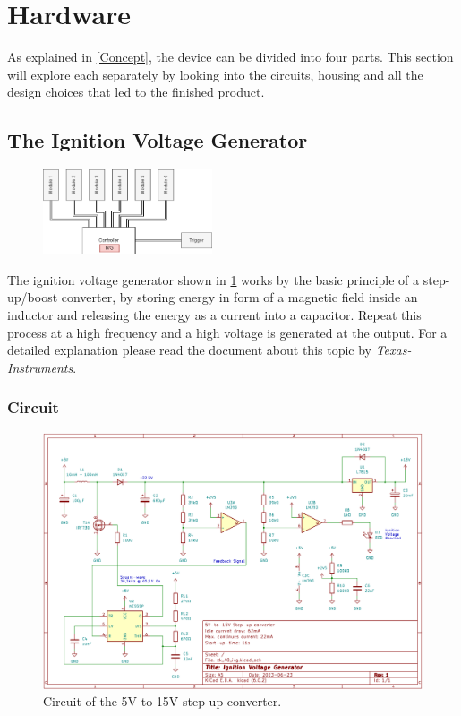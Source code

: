 \section{Hardware}
\label{Hardware}

As explained in \cref{Concept}, the device can be divided into four parts. This section will explore each separately by looking into the circuits, housing and all the design choices that led to the finished product. \\


\subsection{The Ignition Voltage Generator}
\label{Ignition Voltage Generator}

\begin{figure}[!ht]
    \centering
    \includegraphics[width=5cm]{./Figures/concept_ivg.png} 
\end{figure}

\noindent The ignition voltage generator shown in \cref{fig:ivg_circuit} works by the basic principle of a step-up/boost converter, by storing energy in form of a magnetic field inside an inductor and releasing the energy as a current into a capacitor. Repeat this process at a high frequency and a high voltage is generated at the output. For a detailed explanation please read the document about this topic by \textit{Texas-Instruments}.


\subsubsection{Circuit}

\begin{figure}[!ht]
    \centering
    \includegraphics[width=15cm]{./Figures/ivg_circuit.png}
    \caption{Circuit of the 5V-to-15V step-up converter.}
    \label{fig:ivg_circuit}     
\end{figure}

